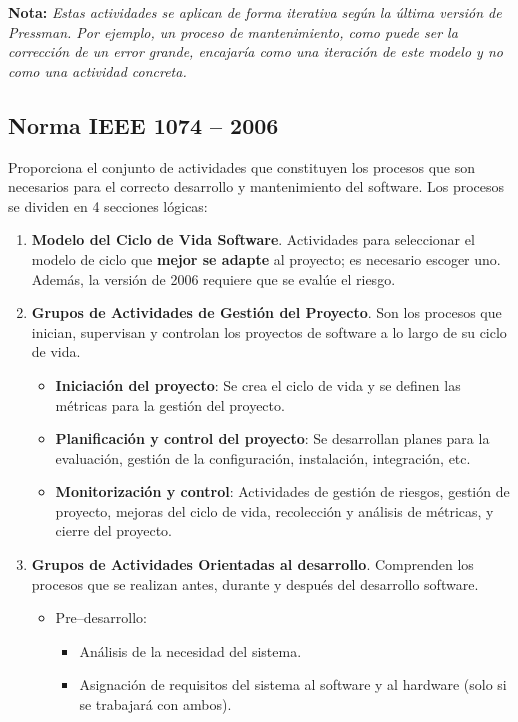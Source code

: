 \textbf{Nota:} \textit{Estas actividades se aplican de forma iterativa según la última versión de Pressman. Por ejemplo, un proceso de mantenimiento, como puede ser la corrección de un error grande, encajaría como una iteración de este modelo y no como una actividad concreta.}

\subsection{Norma IEEE 1074 -- 2006}
Proporciona el conjunto de actividades que constituyen los procesos que son necesarios para el correcto desarrollo y mantenimiento del software. Los procesos se dividen en 4 secciones lógicas:

\begin{enumerate}
    \item \textbf{Modelo del Ciclo de Vida Software}. Actividades para seleccionar el modelo de ciclo que \textbf{mejor se adapte} al proyecto; es necesario escoger uno. Además, la versión de 2006 requiere que se evalúe el riesgo.
    \item \textbf{Grupos de Actividades de Gestión del Proyecto}. Son los procesos que inician, supervisan y controlan los proyectos de software a lo largo de su ciclo de vida.
          \begin{itemize}
              \item \textbf{Iniciación del proyecto}: Se crea el ciclo de vida y se definen las métricas para la gestión del proyecto.
              \item \textbf{Planificación y control del proyecto}: Se desarrollan planes para la evaluación, gestión de la configuración, instalación, integración, etc.
              \item \textbf{Monitorización y control}: Actividades de gestión de riesgos, gestión de proyecto, mejoras del ciclo de vida, recolección y análisis de métricas, y cierre del proyecto.
          \end{itemize}
    \item \textbf{Grupos de Actividades Orientadas al desarrollo}. Comprenden los procesos que se realizan antes, durante y después del desarrollo software.
          \begin{itemize}
              \item Pre--desarrollo:
                    \begin{itemize}
                        \item Análisis de la necesidad del sistema.
                        \item Asignación de requisitos del sistema al software y al hardware (solo si se trabajará con ambos).

\end{itemize}
\end{itemize}
\end{enumerate}
